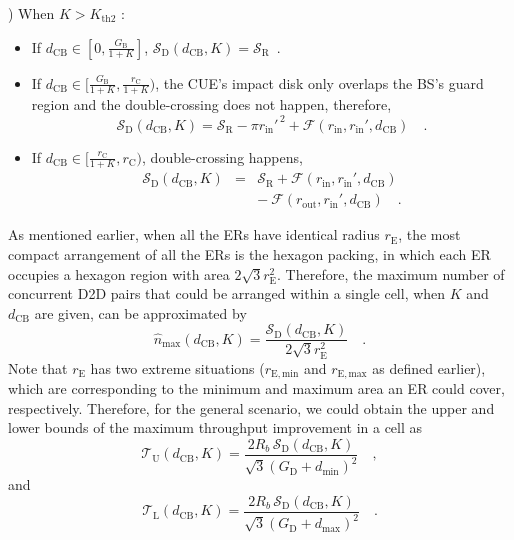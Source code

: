 \documentclass[journal, 10pt]{IEEEtran}
\begin{document}
) When $K > K_\mathrm{th2} $ :
\begin{itemize}
\item If $d_\mathrm{CB} \in [0, \frac{G_\mathrm{B}}{1+K}]$, 
$\mathcal{S}_{\mathrm{D}}\left(d_\mathrm{CB}, K\right) = \mathcal{S}_{\mathrm{R}}$~.
\item If $d_\mathrm{CB} \in [\frac{G_\mathrm{B}}{1+K}, \frac{r_\mathrm{C}}{1+K})$, 
the CUE's impact disk only overlaps the BS's guard region and the double-crossing 
does not happen, therefore,  
\setlength{\arraycolsep}{0.0em}
\begin{equation}
\mathcal{S}_{\mathrm{D}}\left(d_\mathrm{CB}, K\right) {}={}  
\mathcal{S}_{\mathrm{R}} - \pi r_\mathrm{in}'^{\,2} + \mathcal{F}
\left(r_\mathrm{in}, r_\mathrm{in}', d_\mathrm{CB}\right)\quad.
\end{equation}
\setlength{\arraycolsep}{5pt}
\item If $d_\mathrm{CB} \in [\frac{r_\mathrm{C}}{1+K},  r_\mathrm{C})$, 
double-crossing happens,
\setlength{\arraycolsep}{0.0em}
\begin{eqnarray}
\mathcal{S}_{\mathrm{D}}\left(d_\mathrm{CB}, K\right)  &{}={}&  
\mathcal{S}_{\mathrm{R}} + \mathcal{F}\left(r_\mathrm{in}, r_\mathrm{in}', 
d_\mathrm{CB}\right) \nonumber\\
&&{-}\:  \mathcal{F}\left(r_\mathrm{out}, r_\mathrm{in}', d_\mathrm{CB}
\right)\quad.
\end{eqnarray}
\setlength{\arraycolsep}{5pt}
\end{itemize}


As mentioned earlier, when all the ERs have identical radius
$r_\mathrm{E}$, the most compact arrangement of all the ERs is the
hexagon packing, in which each ER occupies a hexagon region with area
$2\sqrt{3}r_\mathrm{E}^2$. Therefore, the maximum number of concurrent
D2D pairs that could be arranged within a single cell, when $K$ and
$d_\mathrm{CB}$ are given, can be approximated by
\begin{equation}
\widehat{n}_{\max}\left(d_\mathrm{CB}, K\right) = 
\frac{\mathcal{S}_{\mathrm{D}}\!\left(d_\mathrm{CB}, K\right)}
{2 \sqrt{3} r_\mathrm{E}^2}\quad. \label{eq:nmax-conti}
\end{equation}
Note that $r_\mathrm{E}$ has two extreme situations 
($r_\mathrm{E, min}$ and $r_\mathrm{E, max}$ as defined earlier), 
which are corresponding to the minimum and maximum area an ER could cover, 
respectively. Therefore, for the general scenario, we could obtain the 
upper and lower bounds of the maximum throughput improvement in a cell as
\begin{equation}
\mathcal{T}_\mathrm{U}\left( d_\mathrm{CB}, K \right) = 
\frac{ 2 R_b \,\mathcal{S}_{\mathrm{D}}\!\left(d_\mathrm{CB}, K\right)}
{ \sqrt{3} (G_\mathrm{D} + d_{\min})^2}\quad,\label{eq:upper2}
\end{equation}
and
\begin{equation}
\mathcal{T}_\mathrm{L} \left(d_\mathrm{CB}, K\right) = 
\frac{ 2 R_b\, \mathcal{S}_{\mathrm{D}}\!\left(d_\mathrm{CB}, K\right)}
{\sqrt{3} (G_\mathrm{D} + d_{\max})^2}\quad. \label{eq:lower}
\end{equation} 
\end{document}

